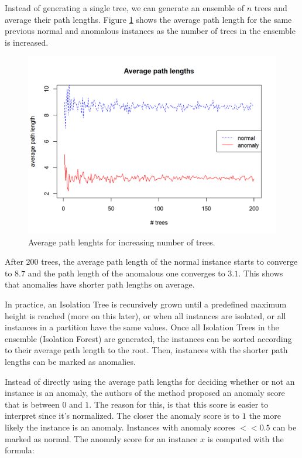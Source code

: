 \documentclass[
  11pt,
]{krantz}
\begin{document}
Instead of generating a single tree, we can generate an ensemble of \(n\) trees and average their path lengths. Figure \ref{fig:anomalyIts} shows the average path length for the same previous normal and anomalous instances as the number of trees in the ensemble is increased.

\begin{figure}

{\centering \includegraphics[width=1\linewidth]{images/anomaly_its} 

}

\caption{Average path lenghts for increasing number of trees.}\label{fig:anomalyIts}
\end{figure}

After \(200\) trees, the average path length of the normal instance starts to converge to \(8.7\) and the path length of the anomalous one converges to \(3.1\). This shows that anomalies have shorter path lengths on average.

In practice, an Isolation Tree is recursively grown until a predefined maximum height is reached (more on this later), or when all instances are isolated, or all instances in a partition have the same values. Once all Isolation Trees in the ensemble (Isolation Forest) are generated, the instances can be sorted according to their average path length to the root. Then, instances with the shorter path lengths can be marked as anomalies.

Instead of directly using the average path lengths for deciding whether or not an instance is an anomaly, the authors of the method proposed an anomaly score that is between \(0\) and \(1\). The reason for this, is that this score is easier to interpret since it's normalized. The closer the anomaly score is to \(1\) the more likely the instance is an anomaly. Instances with anomaly scores \(<< 0.5\) can be marked as normal. The anomaly score for an instance \(x\) is computed with the formula:
\end{document}
